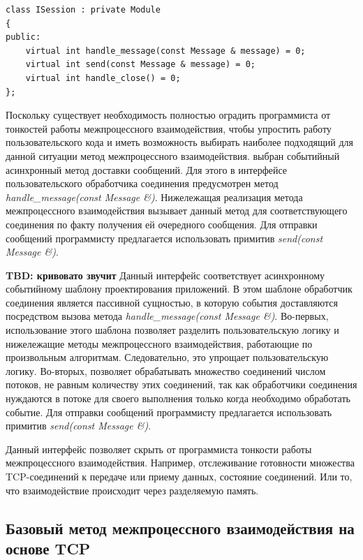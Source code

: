 \begin{lstlisting}[float=!h,caption={Интерфейс пользовательского обработчика соединений на C++},label={chapter31:ServiceHandlerInterface}]
class ISession : private Module
{
public:
	virtual int handle_message(const Message & message) = 0;
	virtual int send(const Message & message) = 0;
	virtual int handle_close() = 0;
};
\end{lstlisting}

Поскольку существует необходимость полностью оградить программиста от тонкостей работы межпроцессного взаимодействия, чтобы упростить работу пользовательского кода и иметь возможность выбирать наиболее подходящий для данной ситуации метод межпроцессного взаимодействия. выбран событийный асинхронный метод доставки сообщений. Для этого в интерфейсе пользовательского обработчика соединения предусмотрен метод \textit{handle\_message(const Message \&)}. Нижележащая реализация метода межпроцессного взаимодействия вызывает данный метод для соответствующего соединения по факту получения ей очередного сообщения. Для отправки сообщений программисту предлагается использовать примитив \textit{send(const Message \&)}.

\textbf{TBD: кривовато звучит}
Данный интерфейс соответствует асинхронному событийному шаблону проектирования приложений. В этом шаблоне обработчик соединения является пассивной сущностью, в которую события доставляются посредством вызова метода \textit{handle\_message(const Message \&)}. Во-первых, использование этого шаблона позволяет разделить пользовательскую логику и нижележащие методы межпроцессного взаимодействия, работающие по произвольным алгоритмам. Следовательно, это упрощает пользовательскую логику. Во-вторых, позволяет обрабатывать множество соединений числом потоков, не равным количеству этих соединений, так как обработчики соединения нуждаются в потоке для своего выполнения только когда необходимо обработать событие. Для отправки сообщений программисту предлагается использовать примитив \textit{send(const Message \&)}.

Данный интерфейс позволяет скрыть от программиста тонкости работы межпроцессного взаимодействия. Например, отслеживание готовности множества TCP-соединений к передаче или приему данных, состояние соединений. Или то, что взаимодействие происходит через разделяемую память.

\subsection{Базовый метод межпроцессного взаимодействия на основе TCP}\label{chapter31:PureTCP}

